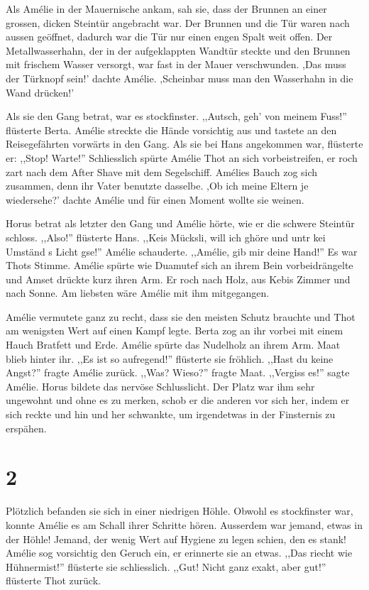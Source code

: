 \documentclass[11pt,titlepage,a5paper]{book}
\begin{document}
Als Amélie in der Mauernische ankam, sah sie, dass der Brunnen an einer grossen, dicken Steintür angebracht war. Der Brunnen und die Tür waren nach aussen geöffnet, dadurch war die Tür nur einen engen  Spalt weit offen. Der Metallwasserhahn, der in der aufgeklappten Wandtür steckte und den Brunnen mit frischem Wasser versorgt, war fast in der Mauer verschwunden. ,Das muss der Türknopf sein!' dachte Amélie. ,Scheinbar muss man den Wasserhahn in die Wand drücken!' 

Als sie den Gang betrat, war es stockfinster. ,,Autsch, geh' von meinem Fuss!'' flüsterte Berta. Amélie streckte die Hände vorsichtig aus und tastete an den Reisegefährten vorwärts in den Gang. Als sie bei Hans angekommen war, flüsterte er: ,,Stop! Warte!'' Schliesslich spürte Amélie Thot an sich vorbeistreifen, er roch zart nach dem After Shave mit dem Segelschiff. Amélies Bauch zog sich zusammen, denn ihr Vater benutzte dasselbe. ,Ob ich meine Eltern je wiedersehe?' dachte Amélie und für einen Moment wollte sie weinen. 

Horus betrat als letzter den Gang und Amélie hörte, wie er die schwere Steintür schloss. ,,Also!'' flüsterte Hans. ,,Keis Mücksli, will ich ghöre und untr kei Umständ s Licht gse!'' Amélie schauderte. ,,Amélie, gib mir deine Hand!'' Es war Thots Stimme. Amélie spürte wie Duamutef sich an ihrem Bein vorbeidrängelte und Amset drückte kurz ihren Arm. Er roch nach Holz, aus Kebis Zimmer und nach Sonne. Am liebsten wäre Amélie mit ihm mitgegangen.

Amélie vermutete ganz zu recht, dass sie den meisten Schutz brauchte und Thot am wenigsten Wert auf einen Kampf legte. Berta zog an ihr vorbei mit einem Hauch Bratfett und Erde. Amélie spürte das Nudelholz an ihrem Arm. Maat blieb hinter ihr. ,,Es ist so aufregend!'' flüsterte sie fröhlich. ,,Hast du keine Angst?'' fragte Amélie zurück. ,,Was? Wieso?'' fragte Maat.  ,,Vergiss es!'' sagte Amélie. Horus bildete das nervöse Schlusslicht. Der Platz war ihm sehr ungewohnt und ohne es zu merken, schob er die anderen vor sich her, indem er sich reckte und hin und her schwankte, um irgendetwas in der Finsternis zu erspähen.

 \section*{2}

Plötzlich befanden sie sich in einer niedrigen Höhle. Obwohl es stockfinster war, konnte Amélie es am Schall ihrer Schritte hören. Ausserdem war jemand, etwas in der Höhle! Jemand, der wenig Wert auf Hygiene zu legen schien, den es stank! Amélie sog vorsichtig den Geruch ein, er erinnerte sie an etwas. ,,Das riecht wie Hühnermist!'' flüsterte sie schliesslich. ,,Gut! Nicht ganz exakt, aber gut!'' flüsterte Thot zurück.
\end{document}
